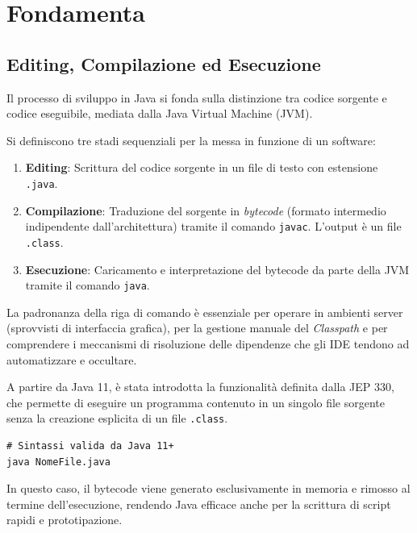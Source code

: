 \chapter{Fondamenta}

\section{Editing, Compilazione ed Esecuzione}

Il processo di sviluppo in Java si fonda sulla distinzione tra codice sorgente e codice eseguibile, mediata dalla Java Virtual Machine (JVM).

Si definiscono tre stadi sequenziali per la messa in funzione di un software:
\begin{enumerate}
    \item \textbf{Editing}: Scrittura del codice sorgente in un file di testo con estensione \texttt{.java}.
    \item \textbf{Compilazione}: Traduzione del sorgente in \textit{bytecode} (formato intermedio indipendente dall'architettura) tramite il comando \texttt{javac}. L'output è un file \texttt{.class}.
    \item \textbf{Esecuzione}: Caricamento e interpretazione del bytecode da parte della JVM tramite il comando \texttt{java}.
\end{enumerate}

\begin{observation}
La padronanza della riga di comando è essenziale per operare in ambienti server (sprovvisti di interfaccia grafica), per la gestione manuale del \textit{Classpath} e per comprendere i meccanismi di risoluzione delle dipendenze che gli IDE tendono ad automatizzare e occultare.
\end{observation}

A partire da Java 11, è stata introdotta la funzionalità definita dalla JEP 330, che permette di eseguire un programma contenuto in un singolo file sorgente senza la creazione esplicita di un file \texttt{.class}.

\begin{lstlisting}[caption={Esecuzione rapida senza compilazione manuale}]
# Sintassi valida da Java 11+
java NomeFile.java
\end{lstlisting}

In questo caso, il bytecode viene generato esclusivamente in memoria e rimosso al termine dell'esecuzione, rendendo Java efficace anche per la scrittura di script rapidi e prototipazione.


